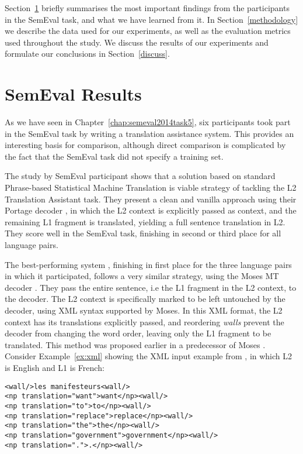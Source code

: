Section~\ref{previous} briefly summarises the most important findings from the
participants in the SemEval task, and what we have learned from it.  In
Section~\ref{methodology} we describe the data used for our experiments, as
well as the evaluation metrics used throughout the study. We discuss the
results of our experiments and formulate our conclusions in
Section~\ref{discuss}.

\section{SemEval Results} %
\label{previous}
\label{sec:participants}

As we have seen in Chapter~\ref{chap:semeval2014task5}, six participants took part in the SemEval task by writing a
translation assistance system. This provides an interesting basis for comparison, although direct comparison is
complicated by the fact that the SemEval task did not specify a training set.

The study by SemEval participant \cite{CNRC} shows that a solution based on
standard Phrase-based Statistical Machine Translation is viable strategy of
tackling the L2 Translation Assistant task. They present a clean and vanilla
approach using their Portage decoder \citep{PORTAGE}, in which the L2 context
is explicitly passed as context, and the remaining L1 fragment is translated,
yielding a full sentence translation in L2. They score well in the SemEval
task, finishing in second or third place for all language pairs.

The best-performing system \citep{UEDIN}, finishing in first place for
the three language pairs in which it participated, follows a very similar
strategy, using the Moses MT decoder \citep{MOSES}. They pass the
entire sentence, i.e the L1 fragment in the L2 context, to the
decoder. The L2 context is specifically marked to be left untouched by
the decoder, using XML syntax supported by Moses. In this XML format,
the L2 context has its translations explicitly passed, and reordering
\emph{walls} prevent the decoder from changing the word order, leaving only
the L1 fragment to be translated. This method was proposed
earlier in a predecessor of Moses \citep{Cabezas+05}. Consider
Example~\ref{ex:xml} showing the XML input example from \cite{UEDIN},
in which L2 is English and L1 is French:

\begin{exmp}
\label{ex:xml}
\begin{lstlisting}
<wall/>les manifesteurs<wall/>
<np translation="want">want</np><wall/>
<np translation="to">to</np><wall/>
<np translation="replace">replace</np><wall/>
<np translation="the">the</np><wall/>
<np translation="government">government</np><wall/>
<np translation=".">.</np><wall/>
\end{lstlisting}
\end{exmp}

